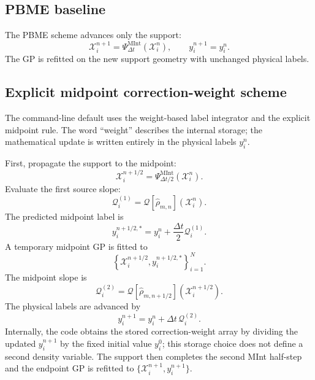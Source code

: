 \documentclass[
  11pt,
  letterpaper,
  onehalfspacing,
  normalmargins,
  equalmargins,
  oneside
]{ut-thesis}
\begin{document}
\subsection{PBME baseline}
\label{appsubsec:pbme-baseline}

The PBME scheme advances only the support:
\begin{equation}
\boldsymbol{\mathcal X}_i^{n+1}
=
\Psi_{\Delta t}^{\mathrm{MInt}}
\left(
\boldsymbol{\mathcal X}_i^n
\right),
\qquad
y_i^{n+1}=y_i^n.
\label{appeq:pbme-step}
\end{equation}
The GP is refitted on the new support geometry with unchanged physical labels.

\subsection{Explicit midpoint correction-weight scheme}
\label{appsubsec:weight-midpoint}

The command-line default uses the weight-based label integrator and the
explicit midpoint rule. The word ``weight'' describes the internal storage;
the mathematical update is written entirely in the physical labels
\(y_i^n\).

First, propagate the support to the midpoint:
\begin{equation}
\boldsymbol{\mathcal X}_i^{n+1/2}
=
\Psi_{\Delta t/2}^{\mathrm{MInt}}
\left(\boldsymbol{\mathcal X}_i^n\right).
\label{appeq:weight-midpoint-support}
\end{equation}
Evaluate the first source slope:
\begin{equation}
\mathcal Q_i^{(1)}
=
\mathcal Q\left[\widehat{\rho}_{m,n}\right]
\left(\boldsymbol{\mathcal X}_i^n\right).
\label{appeq:weight-first-slope}
\end{equation}
The predicted midpoint label is
\begin{equation}
y_i^{n+1/2,*}
=
y_i^n
+
\frac{\Delta t}{2}\mathcal Q_i^{(1)}.
\label{appeq:weight-midpoint-predictor}
\end{equation}
A temporary midpoint GP is fitted to
\[
\left\{
\boldsymbol{\mathcal X}_i^{n+1/2},
y_i^{n+1/2,*}
\right\}_{i=1}^{N}.
\]
The midpoint slope is
\begin{equation}
\mathcal Q_i^{(2)}
=
\mathcal Q\left[\widehat{\rho}_{m,n+1/2}\right]
\left(\boldsymbol{\mathcal X}_i^{n+1/2}\right).
\label{appeq:weight-second-slope}
\end{equation}
The physical labels are advanced by
\begin{equation}
y_i^{n+1}
=
y_i^n
+
\Delta t\,\mathcal Q_i^{(2)}.
\label{appeq:weight-final-label}
\end{equation}
Internally, the code obtains the stored correction-weight array by dividing
the updated \(y_i^{n+1}\) by the fixed initial value \(y_i^0\); this storage
choice does not define a second density variable. The support then completes
the second MInt half-step and the endpoint GP is refitted to
\(\{\boldsymbol{\mathcal X}_i^{n+1},y_i^{n+1}\}\).
\end{document}
